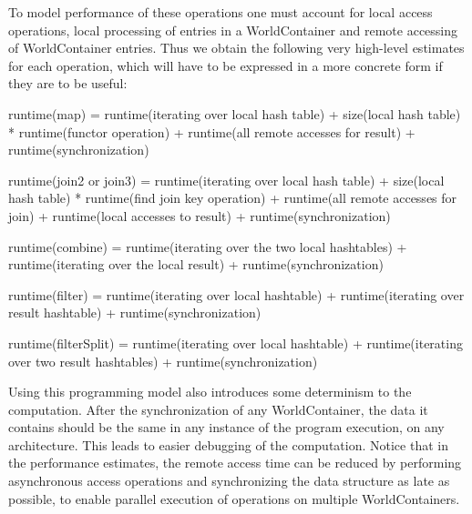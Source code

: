 \documentclass{article}
\begin{document}
\label{sec:Performance}

To model performance of these operations one must account for local access operations,
local processing of entries in a WorldContainer and remote accessing of WorldContainer entries.
Thus we obtain the following very high-level estimates for each operation, which will have to be
expressed in a more concrete form if they are to be useful:

runtime(map) = runtime(iterating over local hash table) + size(local hash
table) * runtime(functor operation) + runtime(all remote accesses for result) +
runtime(synchronization)

runtime(join2 or join3) = runtime(iterating over local hash table) +
size(local hash table) * runtime(find join key operation) + runtime(all remote
accesses for join) + runtime(local accesses to result) +
runtime(synchronization)

runtime(combine) = runtime(iterating over the two local hashtables) +
runtime(iterating over the local result) + runtime(synchronization)

runtime(filter) = runtime(iterating over local hashtable) + runtime(iterating
over result hashtable) + runtime(synchronization)

runtime(filterSplit) = runtime(iterating over local hashtable) +
runtime(iterating over two result hashtables) + runtime(synchronization)

Using this programming model also introduces some determinism to the computation. After
the synchronization of any WorldContainer, the data it contains should be the same in any instance
of the program execution, on any architecture. This leads to easier debugging of the computation.
Notice that in the performance estimates, the remote access time can be reduced by
performing asynchronous access operations and synchronizing the data structure as late as possible,
to enable parallel execution of operations on multiple WorldContainers.
\end{document}
